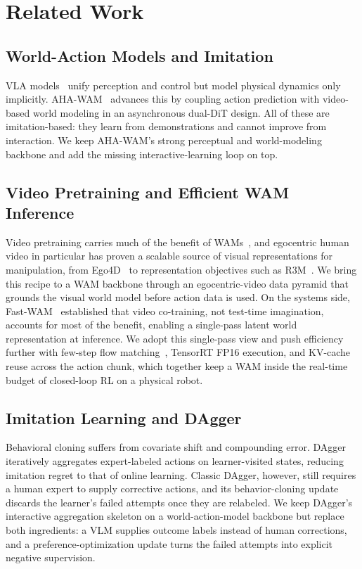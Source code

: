 \documentclass[letterpaper, 10pt, conference]{ieeeconf}
\begin{document}
\section{Related Work}
\label{sec:related_work}

\subsection{World-Action Models and Imitation}
VLA models~\cite{zitkovich2023rt,mees2024octo,black2025pi_} unify perception and control but model physical dynamics only implicitly. AHA-WAM~\cite{ahawam} advances this by coupling action prediction with video-based world modeling in an asynchronous dual-DiT design. All of these are imitation-based: they learn from demonstrations and cannot improve from interaction. We keep AHA-WAM's strong perceptual and world-modeling backbone and add the missing interactive-learning loop on top.

\subsection{Video Pretraining and Efficient WAM Inference}
Video pretraining carries much of the benefit of WAMs~\cite{cheang2024gr2,hu2024vpp,li2025uva}, and egocentric human video in particular has proven a scalable source of visual representations for manipulation, from Ego4D~\cite{grauman2022ego4d} to representation objectives such as R3M~\cite{nair2022r3m}. We bring this recipe to a WAM backbone through an egocentric-video data pyramid that grounds the visual world model before action data is used. On the systems side, Fast-WAM~\cite{yuan2026fastwam} established that video co-training, not test-time imagination, accounts for most of the benefit, enabling a single-pass latent world representation at inference. We adopt this single-pass view and push efficiency further with few-step flow matching~\cite{lipman2023flow}, TensorRT FP16 execution, and KV-cache reuse across the action chunk, which together keep a WAM inside the real-time budget of closed-loop RL on a physical robot.

\subsection{Imitation Learning and DAgger}
Behavioral cloning suffers from covariate shift and compounding error. DAgger~\cite{ross2011dagger} iteratively aggregates expert-labeled actions on learner-visited states, reducing imitation regret to that of online learning. Classic DAgger, however, still requires a human expert to supply corrective actions, and its behavior-cloning update discards the learner's failed attempts once they are relabeled. We keep DAgger's interactive aggregation skeleton on a world-action-model backbone but replace both ingredients: a VLM supplies outcome labels instead of human corrections, and a preference-optimization update turns the failed attempts into explicit negative supervision.
\end{document}
